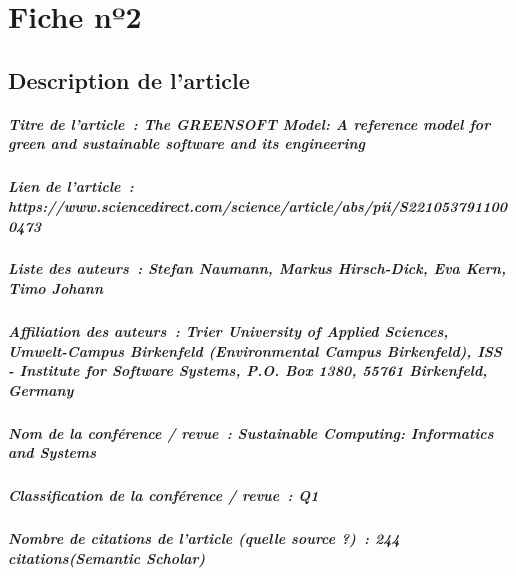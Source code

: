 
\chapter{Fiche nº2} %
\label{app:Fiche2} %

\section{Description de l'article}

\paragraph{Titre de l'article~: \textnormal{The GREENSOFT Model: A reference model for green and sustainable software and its engineering}}
\paragraph{Lien de l'article~: \textnormal{https://www.sciencedirect.com/science/article/abs/pii/S2210537911000473}}
\paragraph{Liste des auteurs~: \textnormal{Stefan Naumann, Markus Hirsch-Dick, Eva Kern, Timo Johann}}
\paragraph{Affiliation des auteurs~: \textnormal{Trier University of Applied Sciences, Umwelt-Campus Birkenfeld (Environmental Campus Birkenfeld), ISS - Institute for Software Systems, P.O. Box 1380, 55761 Birkenfeld, Germany}}
\paragraph{Nom de la conférence / revue~: \textnormal{Sustainable Computing: Informatics and Systems}}
\paragraph{Classification de la conférence / revue~: \textnormal{Q1}}
\paragraph{Nombre de citations de l'article (quelle source ?)~: \textnormal{244 citations(Semantic Scholar)}}

